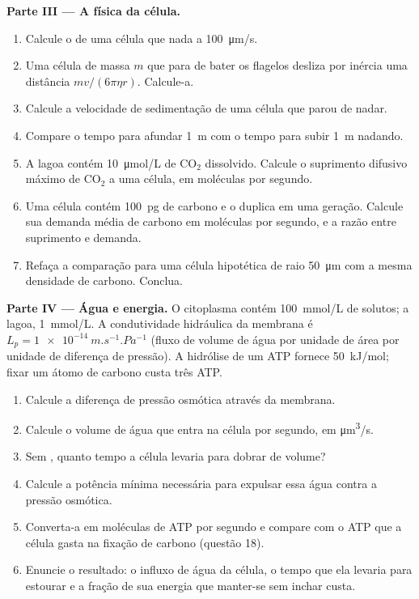 \begin{problem}
\medskip
\noindent\textbf{Parte III --- A física da célula.}
\begin{enumerate}[resume]
  \item Calcule o  de uma célula que nada a
        \qty{100}{\micro m/s}.
  \item Uma célula de massa $m$ que para de bater os flagelos desliza
        por inércia uma distância $mv/(6\pi\eta r)$. Calcule-a.
  \item Calcule a velocidade de sedimentação de uma célula que parou
        de nadar.
  \item Compare o tempo para afundar \qty{1}{m} com o tempo para subir
        \qty{1}{m} nadando.
  \item A lagoa contém \qty{10}{\micro mol/L} de $\mathrm{CO_2}$
        dissolvido. Calcule o suprimento difusivo máximo de
        $\mathrm{CO_2}$ a uma célula, em moléculas por segundo.
  \item Uma célula contém \qty{100}{pg} de carbono e o duplica em uma
        geração. Calcule sua demanda média de carbono em moléculas por
        segundo, e a razão entre suprimento e demanda.
  \item Refaça a comparação para uma célula hipotética de raio
        \qty{50}{\micro m} com a mesma densidade de carbono. Conclua.
\end{enumerate}

\medskip
\noindent\textbf{Parte IV --- Água e energia.}
O citoplasma contém \qty{100}{mmol/L} de solutos; a lagoa,
\qty{1}{mmol/L}. A condutividade hidráulica da membrana é $L_p =
\qty{1e-14}{m.s^{-1}.Pa^{-1}}$ (fluxo de volume de água por unidade de
área por unidade de diferença de pressão). A hidrólise de um ATP
fornece \qty{50}{kJ/mol}; fixar um átomo de carbono custa três ATP.
\begin{enumerate}[resume]
  \item Calcule a diferença de pressão osmótica através da membrana.
  \item Calcule o volume de água que entra na célula por segundo, em
        \unit{\micro m^3/s}.
  \item Sem , quanto tempo a célula levaria para
        dobrar de volume?
  \item Calcule a potência mínima necessária para expulsar essa água
        contra a pressão osmótica.
  \item Converta-a em moléculas de ATP por segundo e compare com o ATP
        que a célula gasta na fixação de carbono (questão 18).
  \item Enuncie o resultado: o influxo de água da célula, o tempo que
        ela levaria para estourar e a fração de sua energia que
        manter-se sem inchar custa.
\end{enumerate}
\end{problem}
